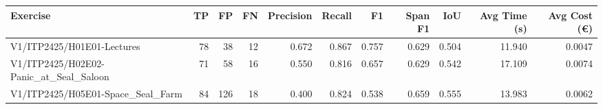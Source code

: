 \begin{tabular}{lrrrrrrrrrr}
Exercise & TP & FP & FN & Precision & Recall & F1 & Span F1 & IoU & Avg Time (s) & Avg Cost (€) \\
\hline
V1/ITP2425/H01E01-Lectures & 78 & 38 & 12 & 0.672 & 0.867 & 0.757 & 0.629 & 0.504 & 11.940 & 0.0047 \\
V1/ITP2425/H02E02-Panic\_at\_Seal\_Saloon & 71 & 58 & 16 & 0.550 & 0.816 & 0.657 & 0.629 & 0.542 & 17.109 & 0.0074 \\
V1/ITP2425/H05E01-Space\_Seal\_Farm & 84 & 126 & 18 & 0.400 & 0.824 & 0.538 & 0.659 & 0.555 & 13.983 & 0.0062 \\
\end{tabular}
